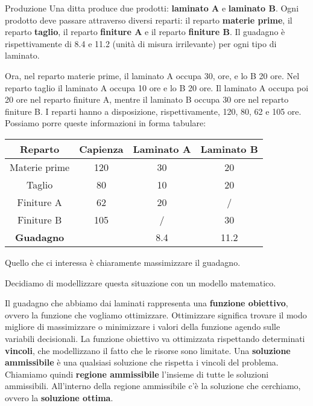 \documentclass[a4paper,11pt]{article}
\begin{document}
\begin{problem}{Produzione}
Una ditta produce due prodotti: \textbf{laminato A} e \textbf{laminato B}.
Ogni prodotto deve passare attraverso diversi reparti: il reparto \textbf{materie prime}, il reparto \textbf{taglio}, il reparto \textbf{finiture A} e il reparto \textbf{finiture B}.
Il guadagno è rispettivamente di 8.4 e 11.2 (unità di misura irrilevante) per ogni tipo di laminato.

Ora, nel reparto materie prime, il laminato A occupa 30, ore, e lo B 20 ore.
Nel reparto taglio il laminato A occupa 10 ore e lo B 20 ore.
Il laminato A occupa poi 20 ore nel reparto finiture A, mentre il laminato B occupa 30 ore nel reparto finiture B.
I reparti hanno a disposizione, rispettivamente, 120, 80, 62 e 105 ore.
Possiamo porre queste informazioni in forma tabulare:

	\center {}
	\begin{tabular} { | c || c | c | c | }
		\hline
		\bfseries Reparto & \bfseries Capienza & \bfseries Laminato A & \bfseries Laminato B \\
		\hline 
		Materie prime & 120 & 30 & 20 \\
		Taglio & 80 & 10 & 20 \\
		Finiture A & 62 & 20 & / \\
		Finiture B & 105 & / & 30 \\
		\hline
		\textbf{Guadagno} & & 8.4 & 11.2 \\
		\hline
	\end{tabular}

	\par\bigskip

Quello che ci interessa è chiaramente massimizzare il guadagno.
\end{problem}

Decidiamo di modellizzare questa situazione con un modello matematico.

Il guadagno che abbiamo dai laminati rappresenta una \textbf{funzione obiettivo}, ovvero la funzione che vogliamo ottimizzare.
Ottimizzare significa trovare il modo migliore di massimizzare o minimizzare i valori della funzione agendo sulle variabili decisionali.
La funzione obiettivo va ottimizzata rispettando determinati \textbf{vincoli}, che modellizzano il fatto che le risorse sono limitate.
Una \textbf{soluzione ammissibile} è una qualsiasi soluzione che rispetta i vincoli del problema.
Chiamiamo quindi \textbf{regione ammissibile} l'insieme di tutte le soluzioni ammissibili.
All'interno della regione ammissibile c'è la soluzione che cerchiamo, ovvero la \textbf{soluzione ottima}.
\end{document}
